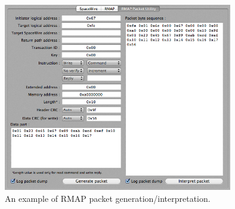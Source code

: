 \documentclass[a4paper,10pt]{article}
\begin{document}
\begin{figure}[htb]
\begin{center}
\includegraphics[width=10cm]{figures/SpaceWireRMAPGUI/RMAPPacketUtilitySection_GenerateInterpret.png}
\vspace{-2mm}
\caption{An example of RMAP packet generation/interpretation.}
\label{figure:RMAPPacketUtilitySection_GenerateInterpret}
\end{center}
\end{figure}
\end{document}
